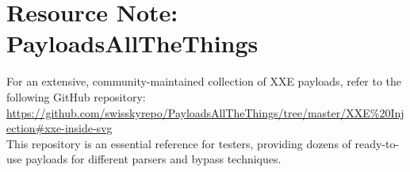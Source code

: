 \documentclass{article}
\begin{document}
\section{Resource Note: PayloadsAllTheThings}

\begin{infobox}
For an extensive, community-maintained collection of XXE payloads, refer to the following GitHub repository:\\

\url{https://github.com/swisskyrepo/PayloadsAllTheThings/tree/master/XXE\%20Injection\#xxe-inside-svg}\\

This repository is an essential reference for testers, providing dozens of ready-to-use payloads for different parsers and bypass techniques.
\end{infobox}
\end{document}
